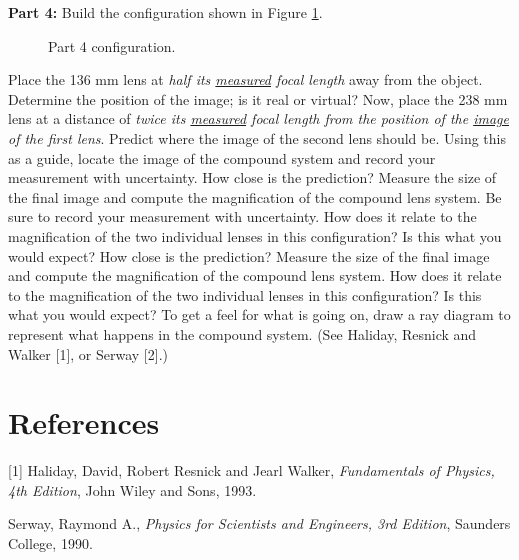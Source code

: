 {\bf Part 4:} Build the configuration shown in Figure \ref{fig:lens2}. 
\begin{figure}
\hspace*{7mm} \epsfxsize=12.5cm  
\caption{Part 4 configuration.}
\label{fig:lens2}
\end{figure}Place 
the 136 mm lens at {\em half its \underline{measured} focal length} away from 
the object. Determine the position of the image; is
it real or virtual? Now, place the 238 mm lens at a distance of {\em twice
its \underline{measured} focal length from the position of the \underline
{image} of the first lens}. Predict where the image of the second lens should
be. Using this as a guide, locate the image of the compound system and record 
your measurement with uncertainty. How close is the prediction? Measure the 
size of the final image and compute the magnification of the compound lens 
system. Be sure to record your measurement with uncertainty. How does it 
relate to the magnification of the two individual lenses in this configuration?
Is this what you would expect?  How close is the prediction? Measure the size 
of the final image and compute the magnification of the compound lens system. 
How does it relate to the magnification of the two individual lenses in this 
configuration? Is this what you would expect? To get a feel for what is going 
on, draw a ray diagram to represent what happens in the compound system. 
(See Haliday, Resnick and Walker [1], or Serway [2].)

\section{References}

[1] Haliday, David, Robert Resnick and Jearl Walker, {\em Fundamentals of 
Physics, 4th Edition}, John Wiley and Sons, 1993.

\noindent [2] Serway, Raymond A., {\em Physics for Scientists and Engineers, 
3rd Edition}, Saunders College, 1990.  